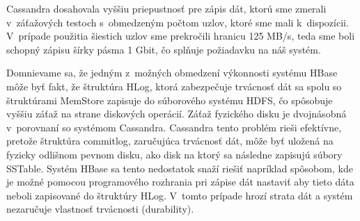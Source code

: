 \documentclass[11pt,twoside,a4paper]{book}
\begin{document}
Cassandra dosahovala vyššiu priepustnosť pre zápis dát, ktorú sme zmerali v~záťažových testoch s~obmedzeným počtom uzlov, ktoré sme mali k~dispozícii. V~prípade použitia šiestich uzlov sme prekročili hranicu 125 MB/s, teda sme boli schopný zápisu šírky pásma 1 Gbit, čo splňuje požiadavku na náš systém.

Domnievame sa, že jedným z~možných obmedzení výkonnosti systému HBase môže byť fakt, že štruktúra HLog, ktorá zabezpečuje trvácnosť dát sa spolu so štruktúrami MemStore zapisuje do súborového systému HDFS, čo spôsobuje vyššiu záťaž na strane diskových operácií. Záťaž fyzického disku je dvojnásobná v~porovnaní so systémom Cassandra. Cassandra tento problém rieši efektívne, pretože štruktúra commitlog, zaručujúca trvácnosť dát, môže byť uložená na fyzicky odlišnom pevnom disku, ako disk na ktorý sa následne zapisujú súbory SSTable. Systém HBase sa tento nedostatok snaží riešiť napríklad spôsobom, kde je možné pomocou programového rozhrania pri zápise dát nastaviť aby tieto dáta neboli zapisované do štruktúry HLog. V~tomto prípade hrozí strata dát a systém nezaručuje vlastnosť trvácnosti (durability).






% 
% 
% 


% 
% 
% 
\end{document}
